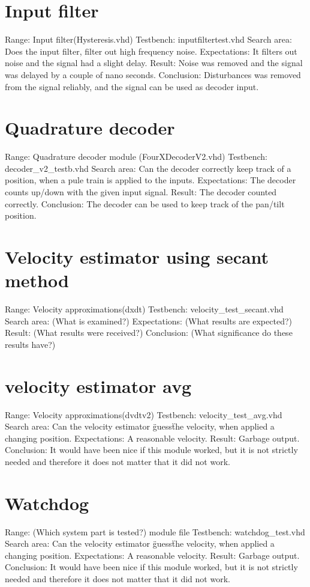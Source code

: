 \section{Input filter}
Range:                  Input filter(Hysteresis.vhd)
Testbench: 				inputfiltertest.vhd
Search area:            Does the input filter, filter out high frequency noise.
Expectations:           It filters out noise and the signal had a slight delay.
Result:                 Noise was removed and the signal was delayed by a couple of nano seconds.
Conclusion:             Disturbances was removed from the signal reliably, and the signal can be used as decoder input.

\section{Quadrature decoder}
Range:                  Quadrature decoder module (FourXDecoderV2.vhd)
Testbench: 				decoder\_v2\_testb.vhd
Search area:            Can the decoder correctly keep track of a position, when a pule train is applied to the inputs.	
Expectations:           The decoder counts up/down with the given input signal.
Result:                 The decoder counted correctly.
Conclusion:             The decoder can be used to keep track of the pan/tilt position.

\section{Velocity estimator using secant method}
Range:                  Velocity approximations(dxdt)
Testbench: 				velocity\_test\_secant.vhd
Search area:            (What is examined?)	
Expectations:           (What results are expected?)
Result:                 (What results were received?)
Conclusion:             (What significance do these results have?)

\section{velocity estimator avg}
Range:                  Velocity approximations(dvdtv2)
Testbench: 				velocity\_test\_avg.vhd
Search area:            Can the velocity estimator \"guess\" the velocity, when applied a changing position.
Expectations:           A reasonable velocity.
Result:                 Garbage output.
Conclusion:             It would have been nice if this module worked, but it is not strictly needed and therefore it does not matter that it did not work.

\section{Watchdog}
Range:                  (Which system part is tested?) module file
Testbench: 				watchdog\_test.vhd
Search area:            Can the velocity estimator \"guess\" the velocity, when applied a changing position.	
Expectations:           A reasonable velocity.
Result:                 Garbage output.
Conclusion:             It would have been nice if this module worked, but it is not strictly needed and therefore it does not matter that it did not work.
